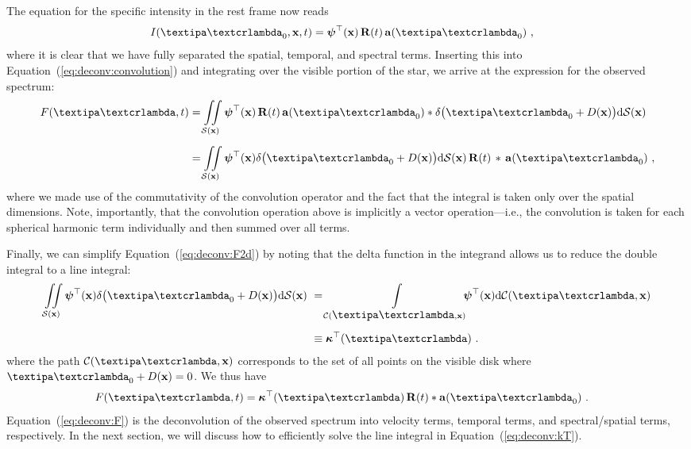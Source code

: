 \documentclass[modern]{aastex631}
\begin{document}
The equation for the specific intensity in the rest frame now reads
%
\begin{align}
    \label{eq:deconv:Ivecfull}
    I(\lnlam_0, \x, t) & =
    \ylmbasis(\x)
    \,
    \R(t)
    \,
    \alm(\lnlam_0)
    \quad ,
\end{align}
%
where it is clear that we have fully separated the spatial, temporal, and spectral terms. 
Inserting this into Equation~(\ref{eq:deconv:convolution}) and integrating over the visible portion of the star, we arrive at the expression for the observed spectrum:
%
%
\begin{align}
    \label{eq:deconv:F2d}
    F(\lnlam, t) & =
    \iint\limits_{\Surf(\x)}
    \ylmbasis(\x)
    \,
    \R(t)
    \,
    \almt(\lnlam_0)
    * \delta\big(\lnlam_0 + \D(\x)\big)
    \mathrm{d}\Surf(\x)
    \nonumber                \\[0.5em]
                         & =
    \iint\limits_{\Surf(\x)}
    \ylmbasis(\x)
    \delta\big(\lnlam_0 + \D(\x)\big)
    \mathrm{d}\Surf(\x)
    \,
    \R(t)
    \,
    *
    \,
    \alm(\lnlam_0)
    \quad ,
\end{align}
%
%
where we made use of the commutativity of the convolution operator and the fact that the integral is taken only over the spatial dimensions.
Note, importantly, that the convolution operation above is implicitly a vector operation---i.e., the convolution is taken for each spherical harmonic term individually and then summed over all terms.

Finally, we can simplify Equation~(\ref{eq:deconv:F2d}) by noting that the delta function in the integrand allows us to reduce the double integral to a line integral:
%
\begin{align}
    \label{eq:deconv:kT}
    \iint\limits_{\Surf(\x)}
    \ylmbasis(\x)
    \delta\big(\lnlam_0 + \D(\x)\big)
    \mathrm{d}\Surf(\x)
    \, \,
     & =
    \int\limits_{\Curve(\lnlam, \x)}
    \hspace*{-0.6em}\ylmbasis(\x)
    \mathrm{d}\Curve(\lnlam, \x)
    \nonumber                     \\[0.5em]
     & \equiv \kT(\lnlam)
    \quad.
\end{align}
%
where the path $\Curve(\lnlam, \x)$ corresponds to the set of all points on the visible disk where $\lnlam_0 + \D(\x) = 0$.
%
We thus have
%
\begin{align}
    \label{eq:deconv:F}
    F(\lnlam, t)
     & =
    \kT(\lnlam) \, \R(t)
    *
    \alm(\lnlam_0)
    \quad.
\end{align}
%
Equation~(\ref{eq:deconv:F}) is the deconvolution of the observed spectrum into velocity terms, temporal terms, and spectral/spatial terms, respectively. 
In the next section, we will discuss how to efficiently solve the line integral in Equation~(\ref{eq:deconv:kT}).
\end{document}
